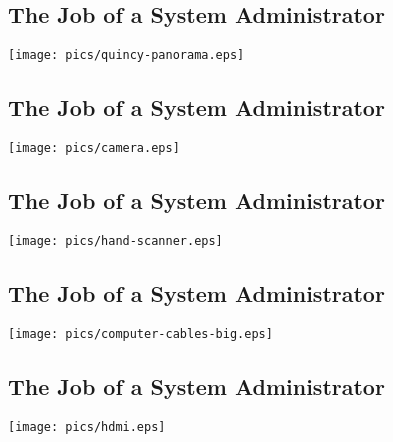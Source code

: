 \documentclass[xga]{xdvislides}
\begin{document}
\subsection{The Job of a System Administrator}
\vspace*{\fill}
\begin{center}
	\texttt{[image: pics/quincy-panorama.eps]} \\
\end{center}
\vspace*{\fill}

\subsection{The Job of a System Administrator}
\vspace*{\fill}
\begin{center}
	\texttt{[image: pics/camera.eps]} \\
\end{center}
\vspace*{\fill}

\subsection{The Job of a System Administrator}
\vspace*{\fill}
\begin{center}
	\texttt{[image: pics/hand-scanner.eps]} \\
\end{center}
\vspace*{\fill}

\subsection{The Job of a System Administrator}
\vspace*{\fill}
\begin{center}
	\texttt{[image: pics/computer-cables-big.eps]} \\
\end{center}
\vspace*{\fill}

\subsection{The Job of a System Administrator}
\vspace*{\fill}
\begin{center}
	\texttt{[image: pics/hdmi.eps]} \\
\end{center}
\vspace*{\fill}
\end{document}
